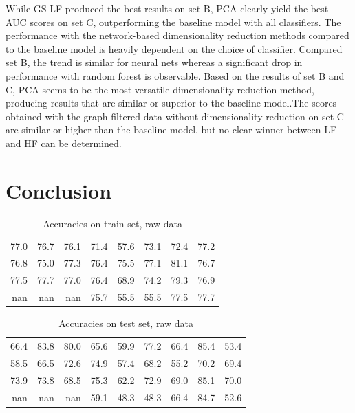 \documentclass[10pt,conference,compsocconf]{IEEEtran}
\newcommand{\beginsupplement}{%
	\setcounter{table}{0}
	\renewcommand{\thetable}{S\arabic{table}}%
	\setcounter{figure}{0}
	\renewcommand{\thefigure}{S\arabic{figure}}%
}
\begin{document}
While GS LF produced the best results on set B, PCA clearly yield the best AUC scores on set C, outperforming the baseline model with all classifiers. The performance with the network-based dimensionality reduction methods compared to the baseline model is heavily dependent on the choice of classifier. Compared set B, the trend is similar for neural nets whereas a significant drop in performance with random forest is observable.
Based on the results of set B and C, PCA seems to be the most versatile dimensionality reduction method, producing results that are similar or superior to the baseline model.The scores obtained with the graph-filtered data without dimensionality reduction on set C are similar or higher than the baseline model, but no clear winner between LF and HF can be determined. 

\section*{Conclusion}




\beginsupplement

\begin{table}[H]
	\centering
	\begin{tabular}{rrrrrrrr}
\hline
  77.0 &  76.7 &  76.1 & 71.4 & 57.6 & 73.1 & 72.4 & 77.2 \\
  76.8 &  75.0 &  77.3 & 76.4 & 75.5 & 77.1 & 81.1 & 76.7 \\
  77.5 &  77.7 &  77.0 & 76.4 & 68.9 & 74.2 & 79.3 & 76.9 \\
 nan   & nan   & nan   & 75.7 & 55.5 & 55.5 & 77.5 & 77.7 \\
\hline
\end{tabular}
	\caption{Accuracies on train set, raw data}
\end{table}

\begin{table}[H]
	\centering
	\begin{tabular}{rrrrrrrrr}
\hline
  66.4 &  83.8 &  80.0 & 65.6 & 59.9 & 77.2 & 66.4 & 85.4 & 53.4 \\
  58.5 &  66.5 &  72.6 & 74.9 & 57.4 & 68.2 & 55.2 & 70.2 & 69.4 \\
  73.9 &  73.8 &  68.5 & 75.3 & 62.2 & 72.9 & 69.0 & 85.1 & 70.0 \\
 nan   & nan   & nan   & 59.1 & 48.3 & 48.3 & 66.4 & 84.7 & 52.6 \\
\hline
\end{tabular}
	\caption{Accuracies on test set, raw data}
\end{table}
\end{document}
